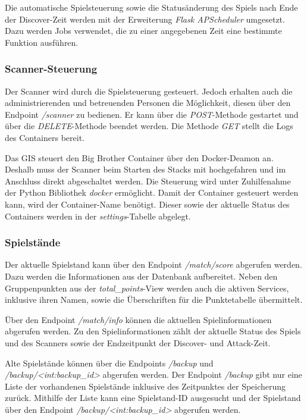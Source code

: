 Die automatische Spielsteuerung sowie die Statusänderung des Spiels nach Ende der Discover-Zeit werden mit der Erweiterung \textit{Flask APScheduler} umgesetzt. Dazu werden Jobs verwendet, die zu einer angegebenen Zeit eine bestimmte Funktion ausführen.

\subsubsection{Scanner-Steuerung}
Der Scanner wird durch die Spielsteuerung gesteuert. Jedoch erhalten auch die administrierenden und betreuenden Personen die Möglichkeit, diesen über den Endpoint \textit{/scanner} zu bedienen.
Er kann über die \textit{POST}-Methode gestartet und über die \textit{DELETE}-Methode beendet werden. Die Methode \textit{GET} stellt die Logs des Containers bereit.

Das GIS steuert den Big Brother Container über den Docker-Deamon an. Deshalb muss der Scanner beim Starten des Stacks mit hochgefahren und im Anschluss direkt abgeschaltet werden. Die Steuerung wird unter Zuhilfenahme der Python Bibliothek \textit{docker} ermöglicht. Damit der Container gesteuert werden kann, wird der Container-Name benötigt. Dieser sowie der aktuelle Status des Containers werden in der \textit{settings}-Tabelle abgelegt.

\subsubsection{Spielstände}
Der aktuelle Spielstand kann über den Endpoint \textit{/match/score} abgerufen werden. Dazu werden die Informationen aus der Datenbank aufbereitet. Neben den Gruppenpunkten aus der \textit{total\_points}-View werden auch die aktiven Services, inklusive ihren Namen, sowie die Überschriften für die Punktetabelle übermittelt.

Über den Endpoint \textit{/match/info} können die aktuellen Spielinformationen abgerufen werden. Zu den Spielinformationen zählt der aktuelle Status des Spiels und des Scanners sowie der Endzeitpunkt der Discover- und Attack-Zeit.

Alte Spielstände können über die Endpoints \textit{/backup} und \textit{/backup/<int:backup\_id>} abgerufen werden.
Der Endpoint \textit{/backup} gibt nur eine Liste der vorhandenen Spielstände inklusive des Zeitpunktes der Speicherung zurück. Mithilfe der Liste kann eine Spielstand-ID ausgesucht und der Spielstand über den Endpoint \textit{/backup/<int:backup\_id>} abgerufen werden.

